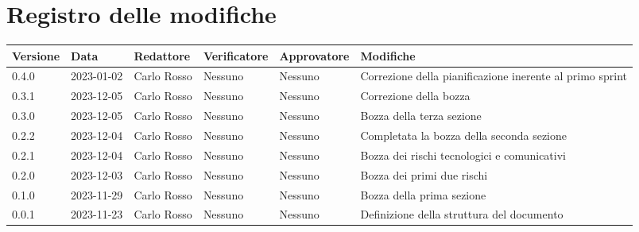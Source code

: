 \section*{Registro delle modifiche}

\begin{table}[H]
	\centering
	\fontsize{10}{12}\selectfont
	\begin{tabularx}{\textwidth}{l|l|l|l|l|X}
		\textbf{Versione} & \textbf{Data} & \textbf{Redattore} & \textbf{Verificatore} & \textbf{Approvatore} & \textbf{Modifiche}                          \\
		\toprule
		0.4.0             & 2023-01-02    & Carlo Rosso        & Nessuno               & Nessuno              & Correzione della pianificazione inerente al
		primo sprint                                                                                                                                        \\
		0.3.1             & 2023-12-05    & Carlo Rosso        & Nessuno               & Nessuno              & Correzione della bozza                      \\
		0.3.0             & 2023-12-05    & Carlo Rosso        & Nessuno               & Nessuno              & Bozza della terza sezione                   \\
		0.2.2             & 2023-12-04    & Carlo Rosso        & Nessuno               & Nessuno              & Completata la bozza della seconda sezione   \\
		0.2.1             & 2023-12-04    & Carlo Rosso        & Nessuno               & Nessuno              & Bozza dei rischi tecnologici e comunicativi \\
		0.2.0             & 2023-12-03    & Carlo Rosso        & Nessuno               & Nessuno              & Bozza dei primi due rischi                  \\
		0.1.0             & 2023-11-29    & Carlo Rosso        & Nessuno               & Nessuno              & Bozza della prima sezione                   \\
		0.0.1             & 2023-11-23    & Carlo Rosso        & Nessuno               & Nessuno              & Definizione della struttura del documento   \\
		\bottomrule
	\end{tabularx}
\end{table}

